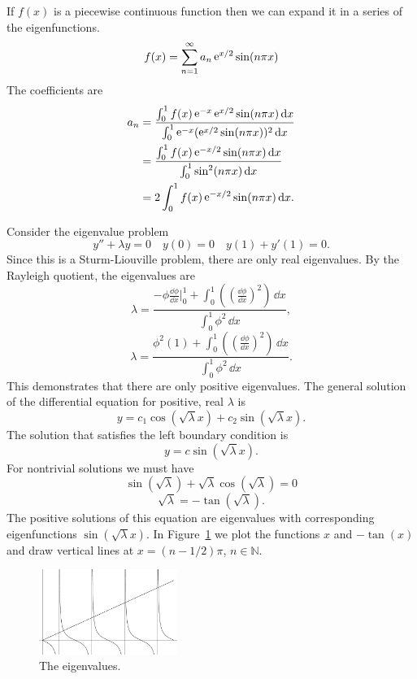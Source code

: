 {\begin{Solution}
  If $f(x)$ is a piecewise continuous function then we can expand it in a
  series of the eigenfunctions.
  \[ f(x) = \sum_{n = 1}^\infty a_n \mathop{\mathrm{e}}\nolimits^{x/2} \sin(n \pi x) \]
  The coefficients are
  \begin{align*}
    a_n &= \frac{\int_0^1 f(x) \mathop{\mathrm{e}}\nolimits^{-x} \mathop{\mathrm{e}}\nolimits^{x/2} \sin(n\pi x)\,\mathrm{d} x}
    {\int_0^1 \mathop{\mathrm{e}}\nolimits^{-x} (\mathop{\mathrm{e}}\nolimits^{x/2} \sin(n \pi x))^2\,\mathrm{d} x} \\
    &= \frac{\int_0^1 f(x) \mathop{\mathrm{e}}\nolimits^{-x/2} \sin(n\pi x)\,\mathrm{d} x}
    {\int_0^1 \sin^2(n\pi x)\,\mathrm{d} x} \\
    &= 2 \int_0^1 f(x) \mathop{\mathrm{e}}\nolimits^{-x/2} \sin(n\pi x)\,\mathrm{d} x.
  \end{align*}
\end{Solution}











\begin{Solution}
  \label{solution y''+ly=0 y+y'=0}
  Consider the eigenvalue problem
  \[ 
  y'' +  \lambda y = 0  \quad y(0) = 0 \quad y(1) + y'(1) = 0.
  \] 
  Since this is a Sturm-Liouville problem, there are only real eigenvalues.
  By the Rayleigh quotient, the eigenvalues are 
  \[ 
  \lambda = \frac{ - \phi \frac{\dd \phi}{\dd x} \Big|_0^1
    + \int_0^1 \left( \left(\frac{\dd \phi}{\dd x}\right)^2 \right)\,\dd x}
  {\int_0^1 \phi^2 \,\dd x},
  \]
  \[ 
  \lambda = \frac{ \phi^2(1) 
    + \int_0^1 \left( \left(\frac{\dd \phi}{\dd x}\right)^2 \right)\,\dd x}
  {\int_0^1 \phi^2 \,\dd x}.
  \]
  This demonstrates that there are only positive eigenvalues.  The general
  solution of the differential equation for positive, real $\lambda$ is
  \[
  y = c_1 \cos \left( \sqrt{\lambda} x \right)
  + c_2 \sin \left( \sqrt{\lambda} x \right).
  \]
  The solution that satisfies the left boundary condition is
  \[
  y = c \sin \left( \sqrt{\lambda} x \right).
  \]
  For nontrivial solutions we must have
  \[
  \sin \left( \sqrt{\lambda} \right) 
  + \sqrt{\lambda} \cos \left( \sqrt{\lambda} \right) = 0
  \]
  \[
  \sqrt{\lambda} = - \tan \left( \sqrt{\lambda} \right).
  \]
  The positive solutions of this equation are eigenvalues with corresponding
  eigenfunctions $\sin \left( \sqrt{\lambda} x \right)$.  In 
  Figure~\ref{x_tanx} we plot the functions $x$ and $-\tan(x)$ and draw 
  vertical lines at $x = (n-1/2) \pi$, $n \in \mathbb{N}$.

  \begin{figure}[h!]
    \begin{center}
      \includegraphics[width=0.4\textwidth]{ode/sturm/x_tanx}
    \end{center}
    \caption{The eigenvalues.}
    \label{x_tanx}
  \end{figure}


\end{Solution}}
